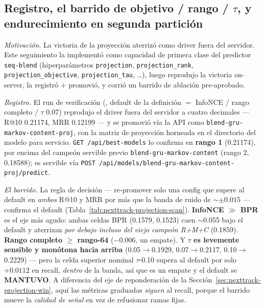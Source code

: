 \documentclass[11pt]{article}
\newcommand{\runid}[1]{\texttt{\small\seqsplit{#1}}}
\begin{document}
\subsection{Registro, el barrido de objetivo / rango / $\tau$, y endurecimiento en segunda partición}
\label{sec:nexttrack-projection-scan}
\emph{Motivación.} La victoria de la proyección aterrizó como driver fuera del servidor.
Este seguimiento la implementó como capacidad de primera clase del predictor
\texttt{seq-blend} (hiperparámetros \texttt{projection}, \texttt{projection\_rank},
\texttt{projection\_objective}, \texttt{projection\_tau}, \dots), luego reprodujo la
victoria on-server, la registró $+$ promovió, y corrió un barrido de ablación
pre-aprobado.

\emph{Registro.} El run de verificación (\runid{run-20260718-191539-1b89c-seq-blend},
default de la definición $=$ InfoNCE / rango completo / $\tau$ \num{0.07}) reprodujo el
driver fuera del servidor a cuatro decimales --- R@10 \num{0.21174}, MRR \num{0.12199}
--- y se promovió vía la API como \texttt{blend-gru-markov-content-proj}, con la matriz
de proyección horneada en el directorio del modelo para servicio. \texttt{GET
/api/best-models} lo confirma en \textbf{rango 1} (\num{0.21174}), por encima del campeón
servible previo \texttt{blend-gru-markov-content} (rango 2, \num{0.18588}); es servible
vía \texttt{POST /api/models/blend-gru-markov-content-proj/predict}.

\emph{El barrido.} La regla de decisión --- re-promover solo una config que supere al
default en \emph{ambos} R@10 y MRR por más que la banda de ruido de
$\sim$$\pm\num{0.015}$ --- confirma el default (Tabla~\ref{tab:nexttrack-projection-scan}).
\textbf{InfoNCE $\gg$ BPR} es el eje más agudo: ambas celdas BPR (\num{0.1579},
\num{0.1523}) caen $\sim$\num{0.055} bajo el default y aterrizan \emph{por debajo incluso
del viejo campeón R+M+C} (\num{0.1859}). \textbf{Rango completo $\ge$ rango-64}
($-\num{0.006}$, un empate). Y \textbf{$\tau$ es levemente sensible y monótona hacia
arriba} (\num{0.05}$\to$\num{0.1929}, \num{0.07}$\to$\num{0.2117},
\num{0.10}$\to$\num{0.2229}) --- pero la celda superior nominal $\tau$-\num{0.10} supera
al default por solo $+\num{0.0112}$ en recall, \emph{dentro} de la banda, así que es un
empate y el default se \textbf{MANTUVO}. A diferencia del eje de reponderación de la
Sección~\ref{sec:nexttrack-projection-win}, aquí las métricas graduadas \emph{siguen} al
recall, porque el barrido mueve la \emph{calidad de señal} en vez de refusionar ramas
fijas.
\end{document}
